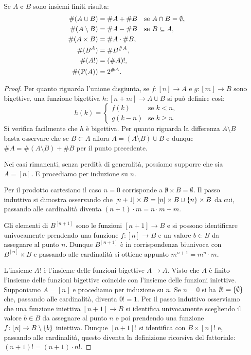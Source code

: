 \begin{theorem}
  Se $A$ e $B$ sono insiemi finiti risulta:
  \begin{align}
    \#(A\cup B) &= \#A + \#B \quad \text{se $A\cap B=\emptyset$},\\
    \#(A\setminus B) &= \#A - \#B \quad \text{se $B\subset A$},\\
    \#(A\times B) &= \#A \cdot \#B, \\
    \#(B^A) &= \#B^{\#A}, \\
    \#(A!) &= (\#A)!, \\
    \#(\P(A)) &= 2^{\#A}.
  \end{align}
\end{theorem}
\begin{proof}
Per quanto riguarda l'unione disgiunta, se $f\colon [n]\to A$ e $g\colon [m]\to B$
sono bigettive, una funzione bigettiva $h\colon [n+m] \to A\cup B$ si può
definire così:
\[
  h(k) = \begin{cases}
    f(k) & \text{se } k<n,\\
    g(k-n) & \text{se } k\ge n.
  \end{cases}
\] 
Si verifica facilmente che $h$ è bigettiva.
Per quanto riguarda la differenza $A\setminus B$ basta osservare che se $B\subset A$
allora $A = (A\setminus B) \cup B$ e dunque $\#A = \#(A\setminus B) + \#B$ per il punto precedente.

Nei casi rimanenti, senza perdità di generalità, 
possiamo supporre che sia $A=[n]$. E procediamo per induzione su $n$.

Per il prodotto cartesiano il caso $n=0$ corrisponde a $\emptyset\times B = \emptyset$.
Il passo induttivo si dimostra osservando che $[n+1]\times B = [n]\times B \cup \ENCLOSE{n} \times B$
da cui, passando alle cardinalità diventa $(n+1)\cdot m = n\cdot m + m$.

Gli elementi di $B^{[n+1]}$ sono le funzioni $[n+1]\to B$ 
e si possono identificare
univocamente prendendo una funzione $f\colon [n]\to B$ e un valore $b\in B$ da assegnare 
al punto $n$. 
Dunque $B^{[n+1]}$ è in corrispondenza biunivoca con $B^{[n]}\times B$
e passando alle cardinalità si ottiene appunto $m^{n+1} = m^n\cdot m$.

L'insieme $A!$ è l'insieme delle funzioni bigettive $A\to A$. 
Visto che $A$ è finito l'insieme delle funzioni bigettive coincide 
con l'insieme delle funzioni iniettive. 
Supponiamo $A=[n]$ e procediamo per induzione su $n$.
Se $n=0$ si ha $\emptyset!=\ENCLOSE{\emptyset}$ che, passando alle cardinalità, diventa $0!=1$.
Per il passo induttivo osserviamo che una funzione iniettiva $[n+1]\to B$ 
si identifica univocamente scegliendo il valore $b\in B$ da assegnare al punto $n$ 
e poi prendendo una funzione $f\colon [n]\to B\setminus\ENCLOSE{b}$ iniettiva. 
Dunque $[n+1]!$ si identifica con $B\times [n]!$ e, passando alle cardinalità, questo diventa 
la definizione ricorsiva del fattoriale: $(n+1)! = (n+1)\cdot n!$.


\end{proof}
